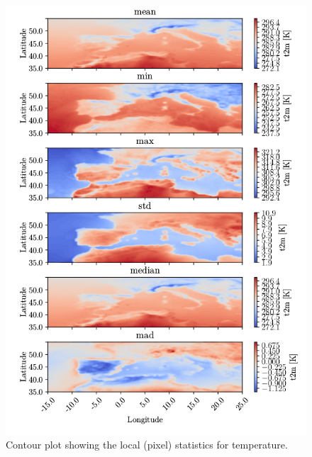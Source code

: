 \begin{figure}[ht]
    \centering
    \includegraphics{python_figs/all_stat_variable_t2m.png}
    \caption{Contour plot showing the local (pixel) statistics for temperature.}
    \label{fig:all_stats_t2m}
\end{figure}


